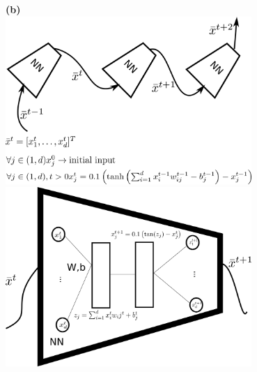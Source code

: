 \documentclass[a4paper]{article}
\newcommand{\1}{\mathds{1}}
\begin{document}
\textbf{(b)}\\
\includegraphics[width=0.7\textwidth]{nnet}\\
\includegraphics[width=0.7\textwidth]{nnet_time_step}
\\
\end{document}
